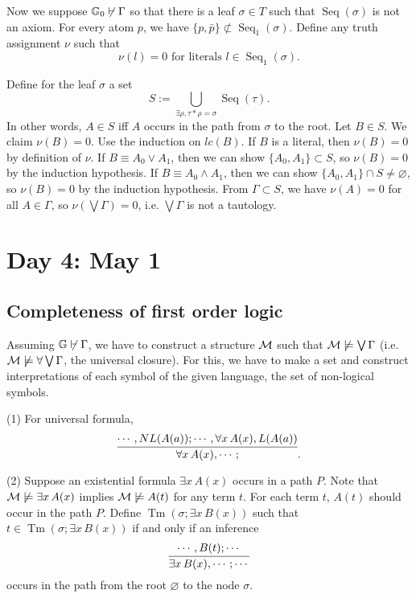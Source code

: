 \documentclass{../../../small}
\DeclareMathOperator{\Tm}{Tm}
\DeclareMathOperator{\Seq}{Seq}
\begin{document}
\begin{pf}
Now we suppose $\mathbb{G}_0\not\vdash\Gamma$ so that there is a leaf $\sigma\in T$ such that $\Seq(\sigma)$ is not an axiom.
For every atom $p$, we have $\{p,\bar p\}\not\subset\Seq_1(\sigma)$.
Define any truth assignment $\nu$ such that
\[\nu(l)=0\text{ for literals }l\in\Seq_1(\sigma).\]

Define for the leaf $\sigma$ a set
\[S:=\bigcup_{\exists\rho,\tau*\rho=\sigma}\Seq(\tau).\]
In other words, $A\in S$ iff $A$ occurs in the path from $\sigma$ to the root.
Let $B\in S$.
We claim $\nu(B)=0$.
Use the induction on $lc(B)$.
If $B$ is a literal, then $\nu(B)=0$ by definition of $\nu$.
If $B\equiv A_0\vee A_1$, then we can show $\{A_0,A_1\}\subset S$, so $\nu(B)=0$ by the induction hypothesis.
If $B\equiv A_0\wedge A_1$, then we can show $\{A_0,A_1\}\cap S\ne\varnothing$, so $\nu(B)=0$ by the induction hypothesis.
From $\Gamma\subset S$, we have $\nu(A)=0$ for all $A\in\Gamma$, so $\nu(\bigvee\Gamma)=0$, i.e. $\bigvee\Gamma$ is not a tautology.
\end{pf}



\newpage
\section{Day 4: May 1}
\subsection*{Completeness of first order logic}

Assuming $\mathbb{G}\not\vdash\Gamma$, we have to construct a structure $\mathcal{M}$ such that $\mathcal{M}\not\models\bigvee\Gamma$ (i.e.$\mathcal{M}\not\models\forall\bigvee\Gamma$, the universal closure).
For this, we have to make a set and construct interpretations of each symbol of the given language, the set of non-logical symbols.

(1)
For universal formula,
\[\infer{\forall x\,A(x),\cdots;}{\cdots, NL(A(a));\cdots,\forall x\,A(x),L(A(a))}.\]

(2)
Suppose an existential formula $\exists x\,A(x)$ occurs in a path $P$.
Note that $\mathcal{M}\not\models \exists x\,A(x)$ implies $\mathcal{M}\not\models A(t)$ for any term $t$.
For each term $t$, $A(t)$ should occur in the path $P$.
Define $\Tm(\sigma;\exists x\,B(x))$ such that $t\in\Tm(\sigma;\exists x\,B(x))$ if and only if an inference
\[\infer{\exists x\,B(x),\cdots;\cdots}{\cdots,B(t);\cdots}\]
occurs in the path from the root $\varnothing$ to the node $\sigma$.
\end{document}
